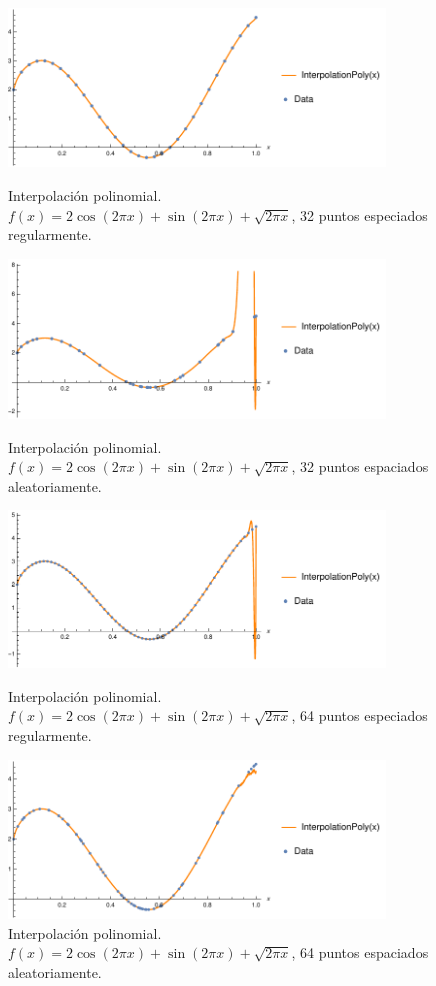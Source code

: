 \documentclass[11pt,letterpaper]{article}
\begin{document}
\begin{figure}
\centering
\includegraphics[width=10cm]{img/9.pdf}
\caption{Interpolación polinomial. $f(x)=2\cos (2\pi x)+\sin (2\pi x)+\sqrt{2\pi x}$, 32 puntos especiados regularmente.}
\includegraphics[width=10cm]{img/10.pdf}
\caption{Interpolación polinomial. $f(x)=2\cos (2\pi x)+\sin (2\pi x)+\sqrt{2\pi x}$, 32 puntos espaciados aleatoriamente.}
\includegraphics[width=10cm]{img/11.pdf}
\caption{Interpolación polinomial. $f(x)=2\cos (2\pi x)+\sin (2\pi x)+\sqrt{2\pi x}$, 64 puntos especiados regularmente.}
\includegraphics[width=10cm]{img/12.pdf}
\caption{Interpolación polinomial. $f(x)=2\cos (2\pi x)+\sin (2\pi x)+\sqrt{2\pi x}$, 64 puntos espaciados aleatoriamente.}
\label{fig12}
\end{figure}
\end{document}

